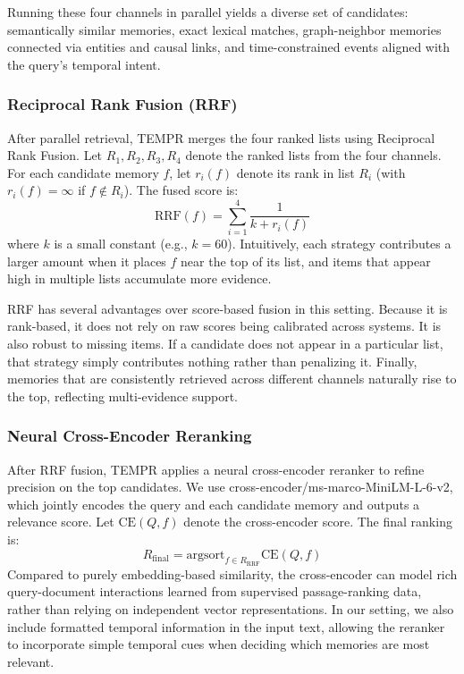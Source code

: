 Running these four channels in parallel yields a diverse set of candidates: semantically similar memories, exact lexical matches, graph-neighbor memories connected via entities and causal links, and time-constrained events aligned with the query's temporal intent.

\subsubsection{Reciprocal Rank Fusion (RRF)}

After parallel retrieval, TEMPR merges the four ranked lists using Reciprocal Rank Fusion. Let $R_1, R_2, R_3, R_4$ denote the ranked lists from the four channels. For each candidate memory $f$, let $r_i(f)$ denote its rank in list $R_i$ (with $r_i(f) = \infty$ if $f \notin R_i$). The fused score is:
\begin{equation}
\text{RRF}(f) = \sum_{i=1}^{4} \frac{1}{k + r_i(f)}
\end{equation}
where $k$ is a small constant (e.g., $k = 60$). Intuitively, each strategy contributes a larger amount when it places $f$ near the top of its list, and items that appear high in multiple lists accumulate more evidence.

RRF has several advantages over score-based fusion in this setting. Because it is rank-based, it does not rely on raw scores being calibrated across systems. It is also robust to missing items. If a candidate does not appear in a particular list, that strategy simply contributes nothing rather than penalizing it. Finally, memories that are consistently retrieved across different channels naturally rise to the top, reflecting multi-evidence support.

\subsubsection{Neural Cross-Encoder Reranking}

After RRF fusion, TEMPR applies a neural cross-encoder reranker to refine precision on the top candidates. We use cross-encoder/ms-marco-MiniLM-L-6-v2, which jointly encodes the query and each candidate memory and outputs a relevance score. Let $\text{CE}(Q, f)$ denote the cross-encoder score. The final ranking is:
\begin{equation}
R_{\text{final}} = \text{argsort}_{f \in R_{\text{RRF}}} \text{CE}(Q, f)
\end{equation}
Compared to purely embedding-based similarity, the cross-encoder can model rich query-document interactions learned from supervised passage-ranking data, rather than relying on independent vector representations. In our setting, we also include formatted temporal information in the input text, allowing the reranker to incorporate simple temporal cues when deciding which memories are most relevant.

